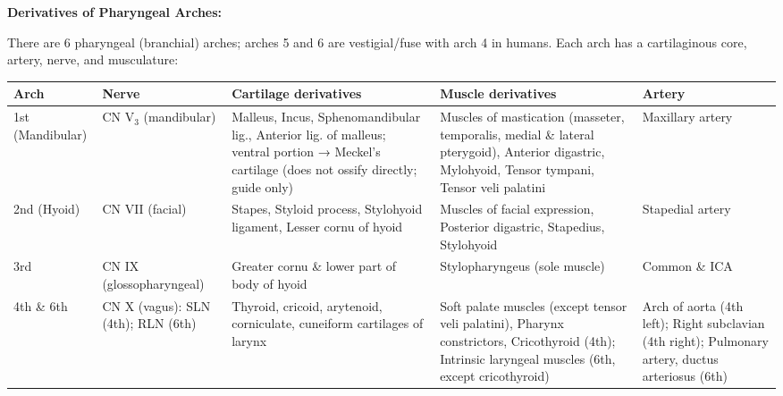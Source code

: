 \documentclass[11pt,a4paper]{article}
\begin{document}
\begin{ansbox}
\textbf{Derivatives of Pharyngeal Arches:}

There are 6 pharyngeal (branchial) arches; arches 5 and 6 are vestigial/fuse with arch 4 in humans. Each arch has a cartilaginous core, artery, nerve, and musculature:

\begin{center}
\begin{tabular}{p{1.5cm}p{1.5cm}p{4cm}p{4cm}p{3cm}}
\toprule
\textbf{Arch} & \textbf{Nerve} & \textbf{Cartilage derivatives} & \textbf{Muscle derivatives} & \textbf{Artery} \\
\midrule
1st (Mandibular) & CN V$_3$ (mandibular) & Malleus, Incus, Sphenomandibular lig., Anterior lig. of malleus; ventral portion → Meckel's cartilage (does not ossify directly; guide only) & Muscles of mastication (masseter, temporalis, medial \& lateral pterygoid), Anterior digastric, Mylohyoid, Tensor tympani, Tensor veli palatini & Maxillary artery \\
2nd (Hyoid) & CN VII (facial) & Stapes, Styloid process, Stylohyoid ligament, Lesser cornu of hyoid & Muscles of facial expression, Posterior digastric, Stapedius, Stylohyoid & Stapedial artery \\
3rd & CN IX (glossopharyngeal) & Greater cornu \& lower part of body of hyoid & Stylopharyngeus (sole muscle) & Common \& ICA \\
4th \& 6th & CN X (vagus): SLN (4th); RLN (6th) & Thyroid, cricoid, arytenoid, corniculate, cuneiform cartilages of larynx & Soft palate muscles (except tensor veli palatini), Pharynx constrictors, Cricothyroid (4th); Intrinsic laryngeal muscles (6th, except cricothyroid) & Arch of aorta (4th left); Right subclavian (4th right); Pulmonary artery, ductus arteriosus (6th) \\
\bottomrule
\end{tabular}
\end{center}


\end{ansbox}
\end{document}
